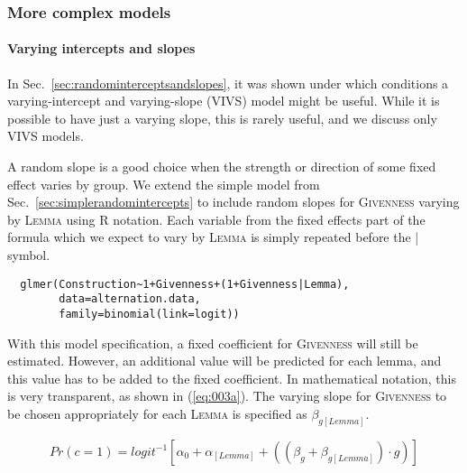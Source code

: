 \subsubsection{More complex models}
\label{sec:morecomplexmodels}

\paragraph{Varying intercepts and slopes}

In Sec.~\ref{sec:randominterceptsandslopes}, it was shown under which conditions a varying-intercept and varying-slope (VIVS) model might be useful.
While it is possible to have just a varying slope, this is rarely useful, and we discuss only VIVS models.

A random slope is a good choice when the strength or direction of some fixed effect varies by group.
We extend the simple model from Sec.~\ref{sec:simplerandomintercepts} to include random slopes for \textsc{Givenness} varying by \textsc{Lemma} using R notation.
Each variable from the fixed effects part of the formula which we expect to vary by \textsc{Lemma} is simply repeated before the | symbol.

\begin{lstlisting}
  glmer(Construction~1+Givenness+(1+Givenness|Lemma),
        data=alternation.data,
        family=binomial(link=logit))
\end{lstlisting}

With this model specification, a fixed coefficient for \textsc{Givenness} will still be estimated.
However, an additional value will be predicted for each lemma, and this value has to be added to the fixed coefficient.
In mathematical notation, this is very transparent, as shown in (\ref{eq:003a}).
The varying slope for \textsc{Givenness} to be chosen appropriately for each \textsc{Lemma} is specified as $\beta_{g[Lemma]}$.

\begin{equation}
  Pr(c=1)=logit^{-1}\left[\alpha_0+\alpha_{[Lemma]}+((\beta_{g}+\beta_{g[Lemma]}) \cdot g)\right]
  \label{eq:003a}
\end{equation}

